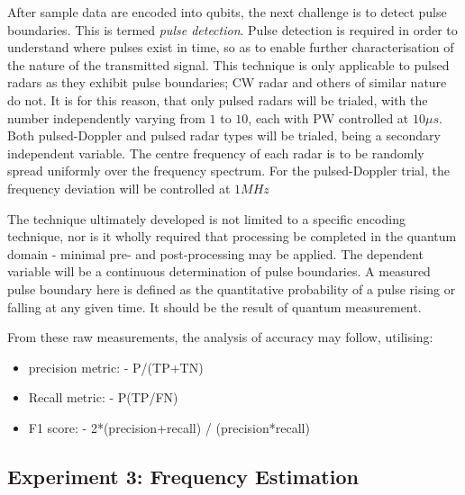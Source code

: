 After sample data are encoded into qubits, the next challenge is to detect pulse boundaries. This is termed \textit{pulse detection}.
Pulse detection is required in order to understand where pulses exist in time, so as to enable further characterisation of the nature of the transmitted signal.
This technique is only applicable to pulsed radars as they exhibit pulse boundaries; \ac{CW} radar and others of similar nature do not.
It is for this reason, that only pulsed radars will be trialed, with the number independently varying from $1$ to $10$, each with \ac{PW} controlled at $10 \mu s$.
Both pulsed-Doppler and pulsed radar types will be trialed, being a secondary independent variable.
The centre frequency of each radar is to be randomly spread uniformly over the frequency spectrum.
For the pulsed-Doppler trial, the frequency deviation will be controlled at $1MHz$

The technique ultimately developed is not limited to a specific encoding technique, nor is it wholly required that processing be completed in the quantum domain - minimal pre- and post-processing may be applied.
The dependent variable will be a continuous determination of pulse boundaries.
A measured pulse boundary here is defined as the quantitative probability of a pulse rising or falling at any given time.
It should be the result of quantum measurement.

From these raw measurements, the analysis of accuracy may follow, utilising:
\begin{itemize}
    \item precision metric:
-  P/(TP+TN)
    \item Recall metric:
-  P(TP/FN)
    \item F1 score:
-  2*(precision+recall) / (precision*recall)
\end{itemize}


\subsection{Experiment 3: Frequency Estimation}

